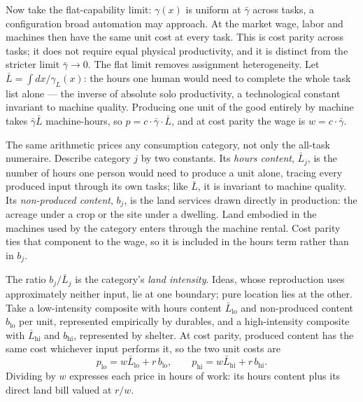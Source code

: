\documentclass[12pt]{article}
\theoremstyle{plain}
\newcommand{\lo}{\mathrm{lo}}
\newcommand{\hi}{\mathrm{hi}}
\begin{document}
Now take the flat-capability limit: $\gamma(x)$ is uniform at $\bar{\gamma}$ across tasks, a configuration broad automation may approach. At the market wage, labor and machines then have the same unit cost at every task. This is cost parity across tasks; it does not require equal physical productivity, and it is distinct from the stricter limit $\bar{\gamma}\to0$. The flat limit removes assignment heterogeneity. Let $\bar{L} = \int dx/\gamma _L(x)$: the hours one human would need to complete the whole task list alone --- the inverse of absolute solo productivity, a technological constant invariant to machine quality. Producing one unit of the good entirely by machine takes $\bar{\gamma}\bar{L}$ machine-hours, so $p = c\cdot \bar{\gamma}\cdot \bar{L}$, and at cost parity the wage is $w = c\cdot \bar{\gamma}$.

The same arithmetic prices any consumption category, not only the all-task numeraire. Describe category $j$ by two constants. Its \emph{hours content}, $\bar{L}_j$, is the number of hours one person would need to produce a unit alone, tracing every produced input through its own tasks; like $\bar{L}$, it is invariant to machine quality. Its \emph{non-produced content}, $b_j$, is the land services drawn directly in production: the acreage under a crop or the site under a dwelling. Land embodied in the machines used by the category enters through the machine rental. Cost parity ties that component to the wage, so it is included in the hours term rather than in $b_j$.

The ratio $b_j/\bar{L}_j$ is the category's \emph{land intensity}. Ideas, whose reproduction uses approximately neither input, lie at one boundary; pure location lies at the other. Take a low-intensity composite with hours content $\bar{L}_{\lo}$ and non-produced content $b_{\lo}$ per unit, represented empirically by durables, and a high-intensity composite with $\bar{L}_{\hi}$ and $b_{\hi}$, represented by shelter. At cost parity, produced content has the same cost whichever input performs it, so the two unit costs are
\begin{equation}\label{eq:composites}
p_{\lo} = w\bar{L}_{\lo} + r\, b_{\lo},
\qquad
p_{\hi} = w\bar{L}_{\hi} + r\, b_{\hi}.
\end{equation}
Dividing by $w$ expresses each price in hours of work: its hours content plus its direct land bill valued at $r/w$.
\end{document}
